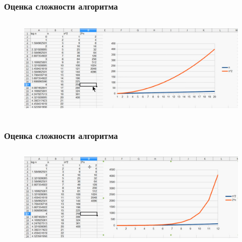 \documentclass[russian, 12pt]{beamer}
\begin{document}
\begin{frame}
\frametitle{Оценка сложности алгоритма}
\begin{figure}
  \includegraphics[width=\linewidth, height=5cm]{img/scal_3.png}
\end{figure}
\end{frame}
\begin{frame}
\frametitle{Оценка сложности алгоритма}
\begin{figure}
  \includegraphics[width=\linewidth, height=5cm]{img/scal_4.png}
\end{figure}
\end{frame}
\end{document}
